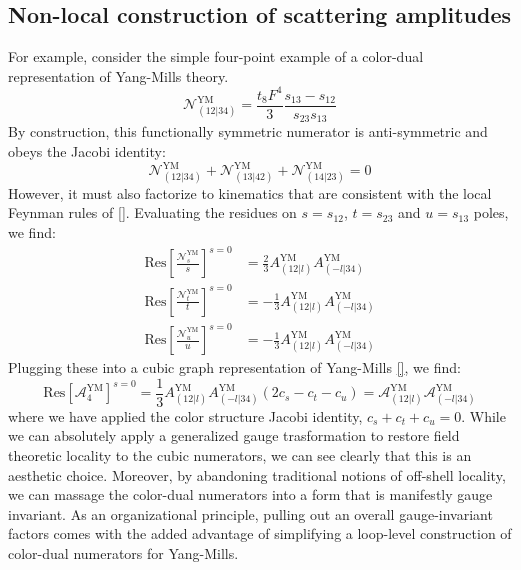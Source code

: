 \documentclass[11pt,letter]{article}
\begin{document}
\subsection{Non-local construction of scattering amplitudes}\label{nonLocalScattering}
 For example, consider the simple four-point example of a color-dual representation of Yang-Mills theory. 
\begin{equation}
\mathcal{N}_{(12|34)}^{\text{YM}} = \frac{t_8F^4}{3} \frac{s_{13}-s_{12}}{s_{23}{s_{13}}}
\end{equation}
By construction, this functionally symmetric numerator is anti-symmetric and obeys the Jacobi identity:
\begin{equation}
\mathcal{N}_{(12|34)}^{\text{YM}} + \mathcal{N}_{(13|42)}^{\text{YM}} +\mathcal{N}_{(14|23)}^{\text{YM}} = 0
\end{equation}
However, it must also factorize to kinematics that are consistent with the local Feynman rules of \ref{}. Evaluating the residues on $s=s_{12}$, $t=s_{23}$ and $u=s_{13}$ poles, we find:
\begin{align}
\text{Res}\left[\frac{ \mathcal{N}_{s}^{\text{YM}} }{s}\right]^{s=0}&= \frac{2}{3}A_{(12|l)}^{\text{YM}}A_{(-l|34)}^{\text{YM}} 
\\
\text{Res}\left[\frac{\mathcal{N}_{t}^{\text{YM}} }{t}\right]^{s=0}&= -\frac{1}{3}A_{(12|l)}^{\text{YM}}A_{(-l|34)}^{\text{YM}} 
\\
\text{Res}\left[\frac{\mathcal{N}_{u}^{\text{YM}} }{u}\right]^{s=0}&= -\frac{1}{3} A_{(12|l)}^{\text{YM}}A_{(-l|34)}^{\text{YM}} 
\end{align}
Plugging these into a cubic graph representation of Yang-Mills \ref{}, we find:
\begin{equation}
\text{Res}\left[\mathcal{A}_4^{\text{YM}}\right]^{s=0} = \frac{1}{3} A_{(12|l)}^{\text{YM}}A_{(-l|34)}^{\text{YM}} (2c_s-c_t-c_u) =  \mathcal{A}_{(12|l)}^{\text{YM}}\mathcal{A}_{(-l|34)}^{\text{YM}} 
\end{equation}
where we have applied the color structure Jacobi identity, $c_s+c_t+c_u=0$. While we can absolutely apply a generalized gauge trasformation \cite{BCJ} to restore field theoretic locality to the cubic numerators, we can see clearly that this is an aesthetic choice. Moreover, by abandoning traditional notions of off-shell locality, we can massage the color-dual numerators into a form that is manifestly gauge invariant. As an organizational principle, pulling out an overall gauge-invariant factors comes with the added advantage of simplifying a loop-level construction of color-dual numerators for Yang-Mills. 
\end{document}
